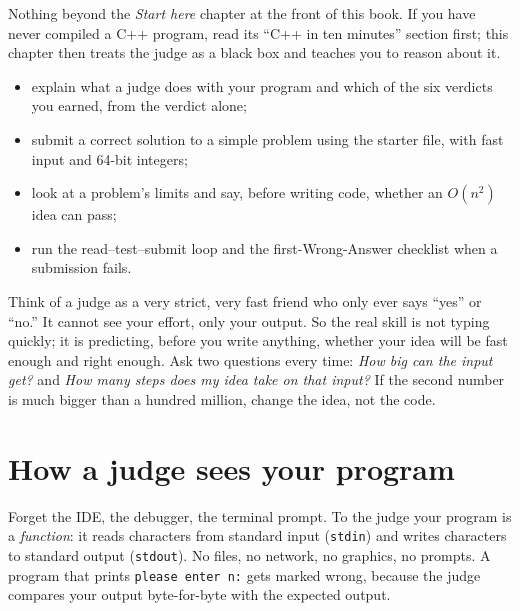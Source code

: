 \begin{rulebox}
Nothing beyond the \emph{Start here} chapter at the front of this book. If you have never compiled a C++ program, read its ``C++ in ten minutes'' section first; this chapter then treats the judge as a black box and teaches you to reason about it.
\end{rulebox}
\begin{wins}
\begin{itemize}
\item explain what a judge does with your program and which of the six verdicts you earned, from the verdict alone;
\item submit a correct solution to a simple problem using the starter file, with fast input and 64-bit integers;
\item look at a problem's limits and say, before writing code, whether an $O(n^2)$ idea can pass;
\item run the read--test--submit loop and the first-Wrong-Answer checklist when a submission fails.
\end{itemize}
\end{wins}
\begin{principle}
Think of a judge as a very strict, very fast friend who only ever says ``yes'' or ``no.'' It cannot see your effort, only your output. So the real skill is not typing quickly; it is predicting, before you write anything, whether your idea will be fast enough and right enough. Ask two questions every time: \emph{How big can the input get?} and \emph{How many steps does my idea take on that input?} If the second number is much bigger than a hundred million, change the idea, not the code.
\end{principle}

\section{How a judge sees your program}\label{sec:judge}

Forget the IDE, the debugger, the terminal prompt. To the judge
your program is a \emph{function}: it reads characters from standard input
(\texttt{stdin}) and writes characters to standard output
(\texttt{stdout}). No files, no network, no graphics, no prompts.
A program that prints \texttt{please enter n:} gets marked wrong, because the
judge compares your output byte-for-byte with the expected output.

